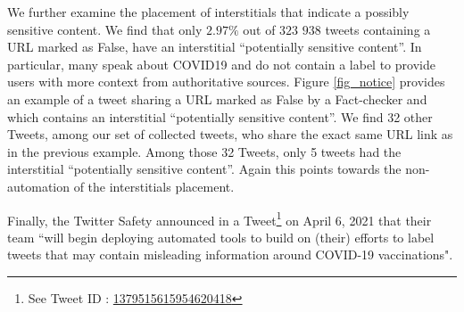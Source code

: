\documentclass{article}
\begin{document}
We further examine the placement of interstitials that indicate a possibly sensitive content. We find that only $2.97\%$ out of $323$ $938$ tweets containing a URL marked as False, have an interstitial ``potentially sensitive content''. In particular, many speak about COVID19 and do not contain a label to provide users with more context from authoritative sources. Figure \ref{fig_notice} provides an example of a tweet sharing a URL marked as False by a Fact-checker and which contains an interstitial ``potentially sensitive content''. We find 32 other Tweets, among our set of collected tweets, who share the exact same URL link as in the previous example. Among those 32 Tweets, only 5 tweets had the interstitial ``potentially sensitive content''. Again this points towards the non-automation of the interstitials placement. 

\smallskip

Finally, the Twitter Safety announced in a Tweet\footnote{See Tweet ID : \href{https://twitter.com/TwitterSafety/status/1379515615954620418}{1379515615954620418}} on April 6, 2021 that their team ``will begin deploying automated tools to build on (their) efforts to label tweets that may contain misleading information around COVID-19 vaccinations". 
\end{document}
